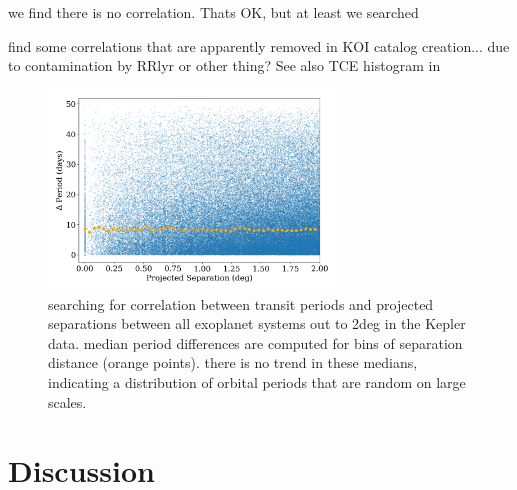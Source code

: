 \documentclass[twocolumn]{aastex62}
\begin{document}
we find there is no correlation. Thats OK, but at least we searched

\citet{coughlin2014} find some correlations that are apparently removed in KOI catalog creation... due to contamination by RRlyr or other thing?
See also TCE histogram in \citet{twicken2016}



\begin{figure}[]
\centering
\includegraphics[width=3in]{../figures/delta_per.png}
\caption{searching for correlation between transit periods and projected separations between all exoplanet systems out to 2deg in the Kepler data. 
median period differences are computed for bins of separation distance (orange points).
there is no trend in these medians, indicating a distribution of orbital periods that are random on large scales.}
\label{fig:2dcor}
\end{figure}







\section{Discussion}
\label{sec:discussion}
%
%
%
%
\end{document}
